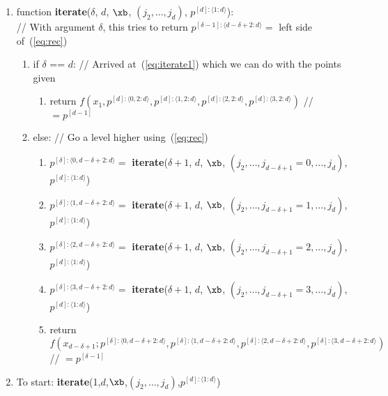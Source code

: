 \documentclass[11pt]{article}
\begin{document}
\begin{enumerate}
\item function \textbf{iterate}($\delta$, $d$, $\xb$, $(j_2, \dots, j_d)$, $p^{[d]:\langle 1:d \rangle}$): \\
// With argument $\delta$, this tries to return $p^{[\delta-1]: \langle d-\delta+2:d \rangle} = $ left side of~(\ref{eq:rec})
\begin{enumerate}
\item if $\delta$ == $d$: // Arrived at~(\ref{eq:iterate1}) which we can do with the points given
\begin{enumerate}
\item return $f \left ( x_1, p^{[d]:\langle 0,2:d \rangle}, p^{[d]:\langle 1,2:d \rangle}, p^{[d]:\langle 2,2:d \rangle}, p^{[d]:\langle 3,2:d \rangle} \right )$ // $= p^{[d-1]}$
\end{enumerate}
\item else: // Go a level higher using~(\ref{eq:rec})
\begin{enumerate}
\item $p^{[\delta]: \langle 0, d-\delta+2:d \rangle} = $ \textbf{iterate}($\delta+1$, $d$, $\xb$, $( j_2, \dots, j_{d-\delta+1}=0, \dots, j_d )$, $p^{[d]:\langle 1:d \rangle}$)
\item $p^{[\delta]: \langle 1, d-\delta+2:d \rangle} = $ \textbf{iterate}($\delta+1$, $d$, $\xb$, $( j_2, \dots, j_{d-\delta+1}=1, \dots, j_d )$, $p^{[d]:\langle 1:d \rangle}$)
\item $p^{[\delta]: \langle 2, d-\delta+2:d \rangle} = $ \textbf{iterate}($\delta+1$, $d$, $\xb$, $( j_2, \dots, j_{d-\delta+1}=2, \dots, j_d )$, $p^{[d]:\langle 1:d \rangle}$)
\item $p^{[\delta]: \langle 3, d-\delta+2:d \rangle} = $ \textbf{iterate}($\delta+1$, $d$, $\xb$, $( j_2, \dots, j_{d-\delta+1}=3, \dots, j_d )$, $p^{[d]:\langle 1:d \rangle}$)
\item return $f \left ( 
x_{d-\delta+1} ; 
p^{[\delta]: \langle 0,d-\delta+2:d \rangle},
p^{[\delta]: \langle 1,d-\delta+2:d \rangle},
p^{[\delta]: \langle 2,d-\delta+2:d \rangle},
p^{[\delta]: \langle 3,d-\delta+2:d \rangle}
\right )$ // $= p^{[\delta-1]}$
\end{enumerate}
\end{enumerate}

\item To start: \textbf{iterate}(1,$d$,$\xb$,$(j_2,\dots,j_d)$,$p^{[d]:\langle 1:d \rangle}$)
\end{enumerate}
\end{document}
